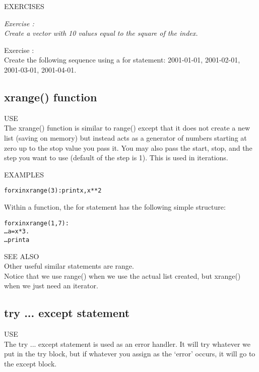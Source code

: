 {\color{blue} {\sf\small EXERCISES}} \\
{\it Exercise  :  \\
Create a vector with 10 values equal to the square of the index.

Exercise  :  \\
Create the following sequence using a {\sf\small for} statement:
2001-01-01, 2001-02-01, 2001-03-01, 2001-04-01.}



\subsection{ {\sf xrange() } function}
{\color{blue} {\sf\small USE}} \\

The {\sf\small xrange()} function is similar to {\sf \small range()}
except that it does not create a new list (saving on memory) but
instead acts as a generator of numbers starting at zero up to the stop
value you pass it.  You may also pass the start, stop, and the step
you want to use (default of the step is 1).  This is used in iterations.

{\color{blue} {\sf\small EXAMPLES}} 
\begin{alltt}
\pytab for x in xrange(3): print x, x ** 2
\end{alltt}
Within a function, the {\sf\small for }  statement has the following
simple structure: 
\begin{alltt}
\pytab for x in xrange(1, 7): 
\ldots    a = x * 3. 
\ldots    print a 
\end{alltt}
  
{\color{blue} {\sf\small SEE ALSO}} \\
Other useful similar statements are {\sf\small range}.  \\

Notice that we use {\sf \small range()} when we use the actual list
created, but {\sf \small xrange()} when we just need an iterator.  

\subsection{ {\sf try ... except } statement}
{\color{blue} {\sf\small USE}} \\
The {\sf\small try ... except} statement is used as an error
handler.  It will try whatever we put in the {\sf\small try} block,
but if whatever you assign as the `error' occurs, it will go to the
{\sf\small except} block.

